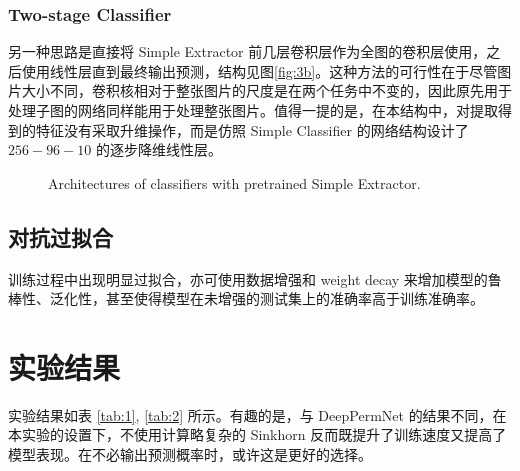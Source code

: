 \documentclass[a4paper]{article}
\begin{document}
\subsubsection{Two-stage Classifier}
另一种思路是直接将 Simple Extractor 前几层卷积层作为全图的卷积层使用，之后使用线性层直到最终输出预测，结构见图\ref{fig:3b}。这种方法的可行性在于尽管图片大小不同，卷积核相对于整张图片的尺度是在两个任务中不变的，因此原先用于处理子图的网络同样能用于处理整张图片。值得一提的是，在本结构中，对提取得到的特征没有采取升维操作，而是仿照 Simple Classifier 的网络结构设计了 $256-96-10$ 的逐步降维线性层。


\begin{figure}[H]
    \centering
    
    \caption{Architectures of classifiers with pretrained Simple Extractor.}
\end{figure}


\subsection{对抗过拟合}
训练过程中出现明显过拟合，亦可使用数据增强和 weight decay 来增加模型的鲁棒性、泛化性，甚至使得模型在未增强的测试集上的准确率高于训练准确率。

\section{实验结果}
实验结果如表 \ref{tab:1}, \ref{tab:2} 所示。有趣的是，与 DeepPermNet \cite{deeppermnet} 的结果不同，在本实验的设置下，不使用计算略复杂的 Sinkhorn 反而既提升了训练速度又提高了模型表现。在不必输出预测概率时，或许这是更好的选择。
\end{document}
